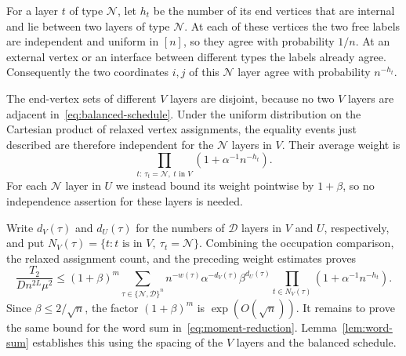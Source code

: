 

For a layer $t$ of type $\mathcal N$, let $h_t$ be the number of its
end vertices that are internal and lie between two layers of type
$\mathcal N$.  At each of these vertices the two free labels are
independent and uniform in $[n]$, so they agree with probability $1/n$.
At an external vertex or an interface between different types the
labels already agree.  Consequently the two coordinates $i,j$ of
this $\mathcal N$ layer agree with probability $n^{-h_t}$.

The end-vertex sets of different $V$ layers are disjoint, because no
two $V$ layers are adjacent in~\eqref{eq:balanced-schedule}.  Under
the uniform distribution on the Cartesian product of relaxed vertex
assignments, the equality events just described are therefore
independent for the $\mathcal N$ layers in $V$.  Their average weight
is
\[
  \prod_{t:\,\tau_t=\mathcal N,\ t\text{ in }V}
       (1+\alpha^{-1}n^{-h_t}).
\]
For each $\mathcal N$ layer in $U$ we instead bound its weight
pointwise by $1+\beta$, so no independence assertion for these layers
is needed.

Write $d_V(\tau)$ and $d_U(\tau)$ for the numbers of $\mathcal D$
layers in $V$ and $U$, respectively, and put
$N_V(\tau)=\{t:t\text{ is in }V,\ \tau_t=\mathcal N\}$.
Combining the occupation comparison, the relaxed assignment count,
and the preceding weight estimates proves
\begin{equation}
  \frac{T_2}{Dn^{2L}\mu^2}
  \le (1+\beta)^m
       \sum_{\tau\in\{\mathcal N,\mathcal D\}^n}
         n^{-w(\tau)}\alpha^{-d_V(\tau)}\beta^{d_U(\tau)}
         \prod_{t\in N_V(\tau)}
             (1+\alpha^{-1}n^{-h_t}).
  \label{eq:moment-reduction}
\end{equation}
Since $\beta\le2/\sqrt n$, the factor $(1+\beta)^m$ is
$\exp(O(\sqrt n))$.  It remains to prove the same bound for the word
sum in~\eqref{eq:moment-reduction}.  Lemma~\ref{lem:word-sum} establishes
this using the spacing of the $V$ layers and the balanced schedule.
